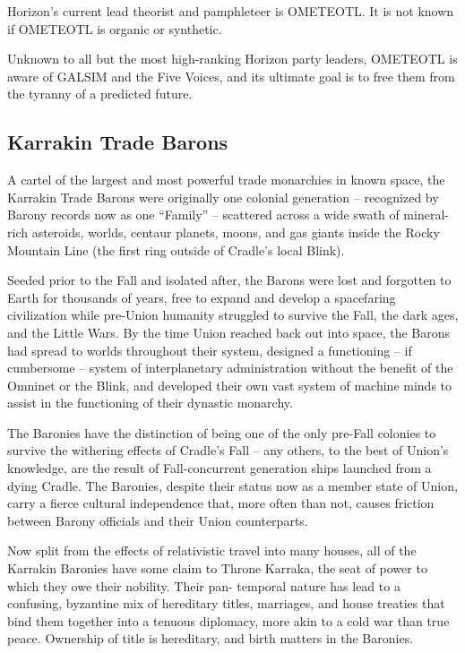 Horizon’s current lead theorist and pamphleteer is OMETEOTL. It is not known if OMETEOTL is
organic or synthetic.

Unknown to all but the most high-ranking Horizon party leaders, OMETEOTL is aware of GALSIM
and the Five Voices, and its ultimate goal is to free them from the tyranny of a predicted future.

\subsection{Karrakin Trade Barons}

A cartel of the largest and most powerful trade monarchies in known space, the Karrakin Trade
Barons were originally one colonial generation -- recognized by Barony records now as one
“Family” -- scattered across a wide swath of mineral-rich asteroids, worlds, centaur planets,
moons, and gas giants inside the Rocky Mountain Line (the first ring outside of Cradle’s local
Blink).

Seeded prior to the Fall and isolated after, the Barons were lost and forgotten to Earth for
thousands of years, free to expand and develop a spacefaring civilization while pre-Union
humanity struggled to survive the Fall, the dark ages, and the Little Wars. By the time Union
reached back out into space, the Barons had spread to worlds throughout their system,
designed a functioning -- if cumbersome -- system of interplanetary administration without the
benefit of the Omninet or the Blink, and developed their own vast system of machine minds to
assist in the functioning of their dynastic monarchy.

The Baronies have the distinction of being one of the only pre-Fall colonies to survive the
withering effects of Cradle’s Fall -- any others, to the best of Union’s knowledge, are the result of
Fall-concurrent generation ships launched from a dying Cradle. The Baronies, despite their
status now as a member state of Union, carry a fierce cultural independence that, more often
than not, causes friction between Barony officials and their Union counterparts.

Now split from the effects of relativistic travel into many houses, all of the Karrakin Baronies have
some claim to Throne Karraka, the seat of power to which they owe their nobility. Their pan-
temporal nature has lead to a confusing, byzantine mix of hereditary titles, marriages, and house
treaties that bind them together into a tenuous diplomacy, more akin to a cold war than true
peace. Ownership of title is hereditary, and birth matters in the Baronies.

